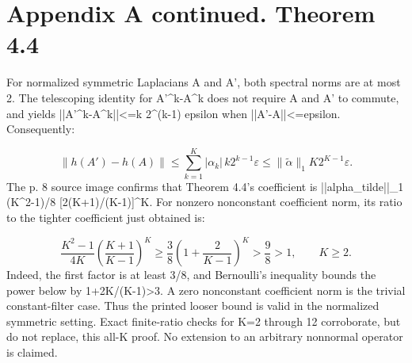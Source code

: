 \documentclass[10pt]{article}
\begin{document}
\section*{Appendix A continued. Theorem 4.4}
For normalized symmetric Laplacians A and A’, both spectral norms are at most 2. The telescoping identity for A’\textasciicircum{}k-A\textasciicircum{}k does not require A and A’ to commute, and yields ||A’\textasciicircum{}k-A\textasciicircum{}k||<=k 2\textasciicircum{}(k-1) epsilon when ||A’-A||<=epsilon. Consequently:\par
\[\|h(A')-h(A)\|\le\sum_{k=1}^K|\alpha_k|\,k2^{k-1}\varepsilon
\le\|\widetilde\alpha\|_1K2^{K-1}\varepsilon.\] The p. 8 source image confirms that Theorem 4.4’s coefficient is ||alpha\_tilde||\_1 (K\textasciicircum{}2-1)/8 [2(K+1)/(K-1)]\textasciicircum{}K. For nonzero nonconstant coefficient norm, its ratio to the tighter coefficient just obtained is:\par
\[\frac{K^2-1}{4K}\left(\frac{K+1}{K-1}\right)^K
\ge\frac38\left(1+\frac2{K-1}\right)^K
>\frac98>1,\qquad K\ge2.\] Indeed, the first factor is at least 3/8, and Bernoulli’s inequality bounds the power below by 1+2K/(K-1)>3. A zero nonconstant coefficient norm is the trivial constant-filter case. Thus the printed looser bound is valid in the normalized symmetric setting. Exact finite-ratio checks for K=2 through 12 corroborate, but do not replace, this all-K proof. No extension to an arbitrary nonnormal operator is claimed.\par
\end{document}
